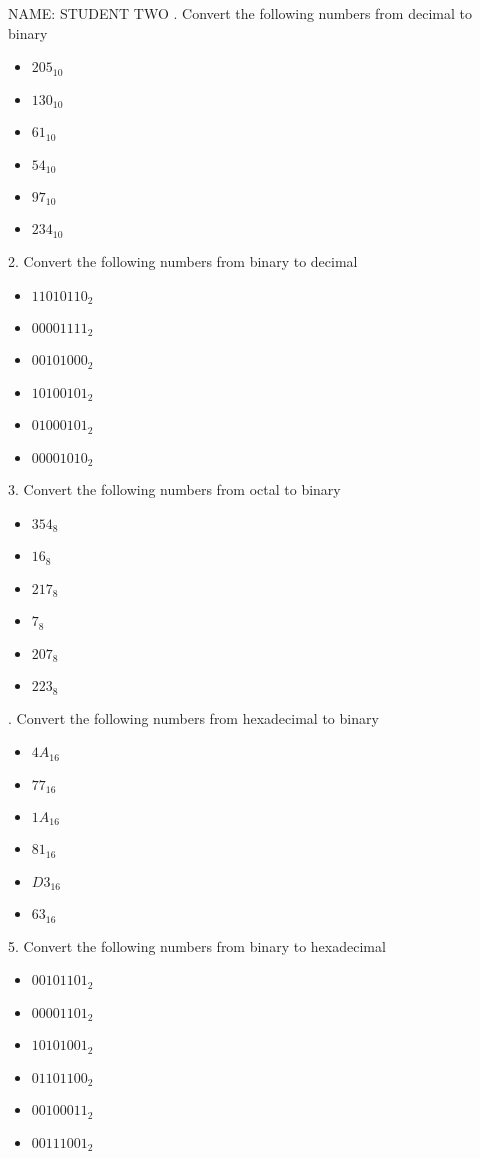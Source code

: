 \documentclass[a4paper,12pt]{article}
\begin{document}
NAME: STUDENT TWO
\newline{}. Convert the following numbers from decimal to binary
\begin{itemize}
\item $205_{10}$
\item $130_{10}$
\item $61_{10}$
\item $54_{10}$
\item $97_{10}$
\item $234_{10}$
\end{itemize}
2. Convert the following numbers from binary to decimal 
\begin{itemize}
\item $11010110_{2}$
\item $00001111_{2}$
\item $00101000_{2}$
\item $10100101_{2}$
\item $01000101_{2}$
\item $00001010_{2}$
\end{itemize}
3. Convert the following numbers from octal to binary 
\begin{itemize}
\item $354_{8}$
\item $16_{8}$
\item $217_{8}$
\item $7_{8}$
\item $207_{8}$
\item $223_{8}$
\end{itemize}. Convert the following numbers from hexadecimal to binary 
\begin{itemize}
\item $4A_{16}$
\item $77_{16}$
\item $1A_{16}$
\item $81_{16}$
\item $D3_{16}$
\item $63_{16}$
\end{itemize}
5. Convert the following numbers from binary to hexadecimal 
\begin{itemize}
\item $00101101_{2}$
\item $00001101_{2}$
\item $10101001_{2}$
\item $01101100_{2}$
\item $00100011_{2}$
\item $00111001_{2}$
\end{itemize}\newpage
\end{document}

